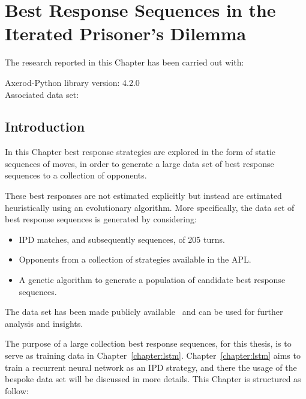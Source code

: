 \chapter{Best Response Sequences in the Iterated Prisoner's Dilemma}\label{chapter:best_response_sequence}

\begin{center}
    The research reported in this Chapter has been carried out with:

    Axerod-Python library version: 4.2.0 \\
    Associated data set: \cite{Glynatsi2020_sequences} \\ \vspace{.5cm}
\end{center}

\section{Introduction}

In this Chapter best response strategies are explored in the form
of static sequences of moves, in order to generate a large data set of best
response sequences to a collection of opponents.

These best responses are not estimated explicitly but instead are
estimated heuristically using an evolutionary algorithm. More specifically,
the data set of best response sequences is generated by considering:

\begin{itemize}
    \item IPD matches, and subsequently sequences, of 205 turns.
    \item Opponents from a collection of \numberofstrategiesbestsequences strategies
    available in the APL.
    \item A genetic algorithm to generate a population of candidate best response
    sequences.
\end{itemize}

The data set has been made publicly available~\cite{Glynatsi2020_sequences} and
can be used for further analysis and insights.

The purpose of a large collection best response sequences, for this thesis, is
to serve as training data in Chapter~\ref{chapter:lstm}.
Chapter~\ref{chapter:lstm} aims to train a recurrent neural network as an IPD
strategy, and there the usage of the bespoke data set will be discussed in more
details. This Chapter is structured as follow:

